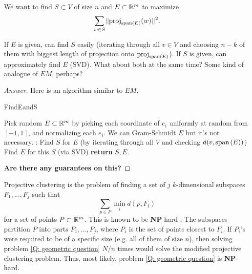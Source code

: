 \documentclass{article}
\begin{document}
\begin{question}
We want to find $S\subset V$ of size $n$ and $E\subset \mathbb{R}^m$ to maximize $$\sum_{w\in S}\norm{\proj_{\vspan{E}}(w)}^2.$$

If $E$ is given, can find $S$ easily (iterating through all $v\in V$ and choosing $n-k$ of them with biggest length of projection onto $\text{proj}_{\text{span}\left(E\right)}$). If $S$ is given, can approximately find $E$ (SVD). What about both at the same time? Some kind of analogue of $EM$, perhaps?
\end{question}

\begin{proof}[Answer]
Here is an algorithm similar to $EM$.
\begin{algorithm}[H]
\caption{FindEandS}
\label{alg: EM-like alg}
    \begin{algorithmic}[1]
    \State Pick random $E\subset \mathbb{R}^m$ by picking each coordinate of $e_i$ uniformly at random from $[-1,1]$, and normalizing each $e_i$. We can Gram-Schmidt $E$ but it's not necessary.
    :
        \State Find $S$ for $E$ (by iterating through all $V$ and checking $d(v,\text{span}\left(E\right))$)
        \State Find $E$ for this $S$ (via SVD)
    \EndWhile
    \textbf{return} $S,E$.
    \end{algorithmic}
\end{algorithm}
\textbf{Are there any guarantees on this?}
\end{proof}

\begin{question}
    Projective clustering is the problem of finding a set of $j$ $k$-dimensional subspaces $F_1,...,F_j$ such that $$\sum_{p\in P}\min_i d(p,F_i)$$
    for a set of points $P\subset \mathbb{R}^m$. This is known to be \textbf{NP}-hard \cite{deshpande2006matrix}. The subspaces partition $P$ into parts $P_1,...,P_j$, where $P_i$ is the set of points closest to $F_i$. If $P_i$'s were required to be of a specific size (e.g. all of them of size $n$), then solving problem \ref{Q: geometric question} $N/n$ times would solve the modified projective clustering problem. Thus, most likely, problem \ref{Q: geometric question} is \textbf{NP}-hard.
\end{question}
\end{document}
